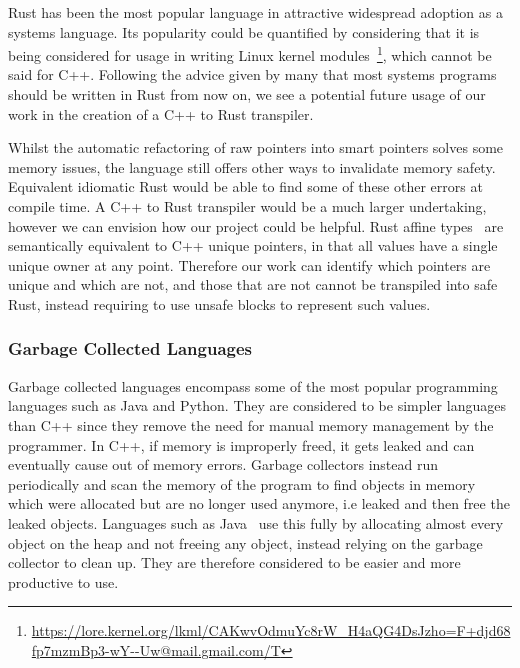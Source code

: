 \documentclass{proposal}
\begin{document}
    Rust has been the most popular language in attractive widespread adoption as a systems language.
    Its popularity could be quantified by considering that it is being considered for usage in writing Linux kernel modules~\footnote{\url{https://lore.kernel.org/lkml/CAKwvOdmuYc8rW_H4aQG4DsJzho=F+djd68fp7mzmBp3-wY--Uw@mail.gmail.com/T}}, which cannot be said for C++.
    Following the advice given by many that most systems programs should be written in Rust from now on, we see a potential future usage of our work in the creation of a C++ to Rust transpiler.

    Whilst the automatic refactoring of raw pointers into smart pointers solves some memory issues, the language still offers other ways to invalidate memory safety.
    Equivalent idiomatic Rust would be able to find some of these other errors at compile time.
    A C++ to Rust transpiler would be a much larger undertaking, however we can envision how our project could be helpful.
    Rust affine types~\cite{Balasubramanian2017} are semantically equivalent to C++ unique pointers, in that all values have a single unique owner at any point.
    Therefore our work can identify which pointers are unique and which are not, and those that are not cannot be transpiled into safe Rust, instead requiring to use unsafe blocks to represent such values.

    \subsubsection{Garbage Collected Languages}

    Garbage collected languages encompass some of the most popular programming languages such as Java and Python.
    They are considered to be simpler languages than C++ since they remove the need for manual memory management by the programmer.
    In C++, if memory is improperly freed, it gets leaked and can eventually cause out of memory errors.
    Garbage collectors instead run periodically and scan the memory of the program to find objects in memory which were allocated but are no longer used anymore, i.e leaked and then free the leaked objects.
    Languages such as Java~\cite{Tauro2012} use this fully by allocating almost every object on the heap and not freeing any object, instead relying on the garbage collector to clean up.
    They are therefore considered to be easier and more productive to use.
\end{document}
